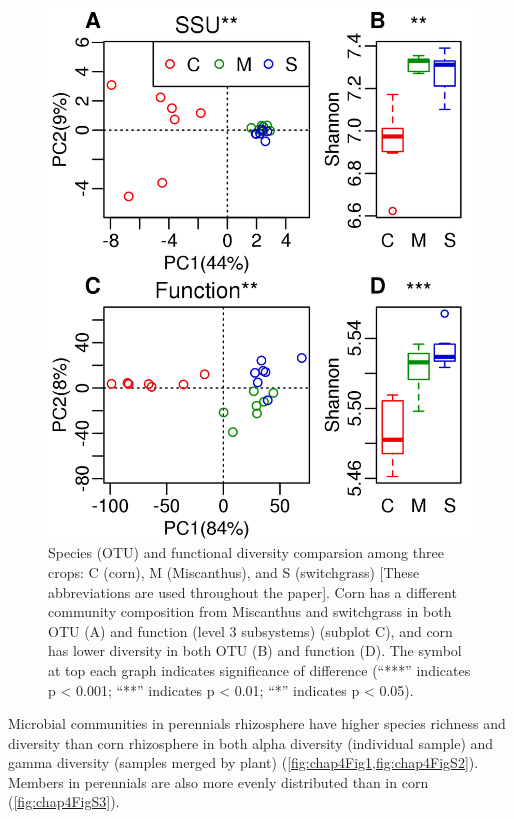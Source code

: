 \documentclass[]{msu-thesis}
\begin{document}
\begin{figure}[tbph!]
  \centering
  \includegraphics[scale=1]{figs/chap4-otu-subsys-pca-shannon}
  \caption[Species (OTU) and functional diversity comparsion among three crops]{Species (OTU) and functional diversity comparsion among three crops: C (corn), M (Miscanthus), and S (switchgrass) [These abbreviations are used throughout the paper]. Corn has a different community composition from Miscanthus and switchgrass in both OTU (A) and function (level 3 subsystems) (subplot C), and corn has lower diversity in both OTU (B) and function (D). The symbol at top each graph indicates significance of difference (``***'' indicates p < 0.001; ``**'' indicates p < 0.01; ``*'' indicates p < 0.05).}
  \label{fig:chap4Fig1}
\end{figure}


Microbial communities in perennials rhizosphere have higher species richness and diversity than corn rhizosphere in both alpha diversity (individual sample) and gamma diversity (samples merged by plant) (\cref{fig:chap4Fig1,fig:chap4FigS2}). Members in perennials are also more evenly distributed than in corn (\cref{fig:chap4FigS3}).
\end{document}
